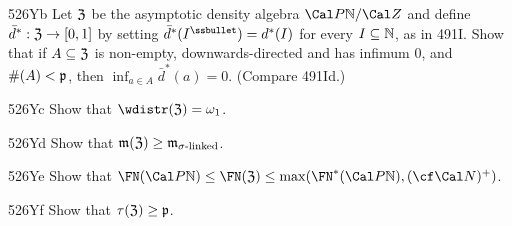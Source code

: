 {\spheader 526Yb Let $\frak Z$ be the asymptotic density
algebra $\Cal P\Bbb N/\Cal Z$
and define $\bar d^*:\frak Z\to[0,1]$ by setting
$\bar d^*(I^{\ssbullet})=d^*(I)$ for every $I\subseteq\Bbb N$, as in
491I.   Show that if $A\subseteq\frak Z$ is non-empty, downwards-directed
and has infimum $0$, and $\#(A)<\frak p$, then
$\inf_{a\in A}\bar d^*(a)=0$.   (Compare 491Id.)

\spheader 526Yc Show that $\wdistr(\frak Z)=\omega_1$.

\spheader 526Yd Show that
$\frak m(\frak Z)\ge\frak m_{\sigma\text{-linked}}$.

\spheader 526Ye Show that $\FN(\Cal P\Bbb N)\le\FN(\frak Z)
\le\max(\FN^*(\Cal P\Bbb N),(\cf\Cal N)^+)$.

\spheader 526Yf Show that $\tau(\frak Z)\ge\frak p$.
}%

